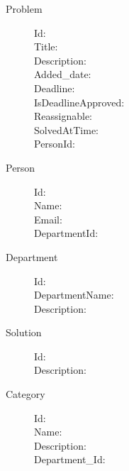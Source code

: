 \begin{description}
\item[Problem]\hfill
\begin{description}
\item[Id:]
\item[Title:]
\item[Description:]
\item[Added_date:]
\item[Deadline:]
\item[IsDeadlineApproved:]
\item[Reassignable:]
\item[SolvedAtTime:]
\item[PersonId:]
\end{description}
\end{description}

\begin{description}
\item[Person]\hfill
\begin{description}
\item[Id:]
\item[Name:]
\item[Email:]
\item[DepartmentId:]
\end{description}
\end{description}

\begin{description}
\item[Department]\hfill
\begin{description}
\item[Id:]
\item[DepartmentName:]
\item[Description:]
\end{description}
\end{description}

\begin{description}
\item[Solution]\hfill
\begin{description}
\item[Id:]
\item[Description:]
\end{description}
\end{description}

\begin{description}
\item[Category]\hfill
\begin{description}
\item[Id:]
\item[Name:]
\item[Description:]
\item[Department_Id:]
\end{description}
\end{description}

